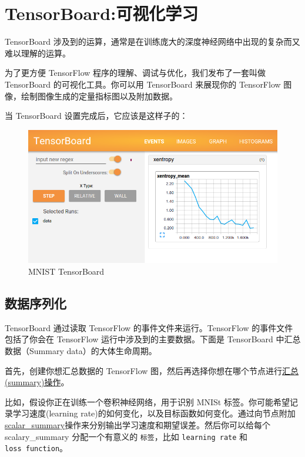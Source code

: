 

\section{TensorBoard:可视化学习　}\label{vis_learning}

TensorBoard
涉及到的运算，通常是在训练庞大的深度神经网络中出现的复杂而又难以理解的运算。

为了更方便 TensorFlow 程序的理解、调试与优化，我们发布了一套叫做
TensorBoard 的可视化工具。你可以用 TensorBoard 来展现你的 TensorFlow
图像，绘制图像生成的定量指标图以及附加数据。

当 TensorBoard 设置完成后，它应该是这样子的：

\begin{figure}[htbp]
\centering
\includegraphics[width=.95\textwidth]{../SOURCE/images/mnist_tensorboard.png}
\caption{MNIST TensorBoard}
\end{figure}

\subsection{数据序列化　}\label{ux6570ux636eux5e8fux5217ux5316}

TensorBoard 通过读取 TensorFlow 的事件文件来运行。TensorFlow
的事件文件包括了你会在 TensorFlow 运行中涉及到的主要数据。下面是
TensorBoard 中汇总数据（Summary data）的大体生命周期。

首先，创建你想汇总数据的 TensorFlow
图，然后再选择你想在哪个节点进行\href{../api_docs/python/train.md\#summary_options}{汇总(summary)操作}。

比如，假设你正在训练一个卷积神经网络，用于识别 MNISt
标签。你可能希望记录学习速度(learning
rate)的如何变化，以及目标函数如何变化。通过向节点附加\href{../api_docs/python/train.md\#scalary_summary}{scalar\_summary}操作来分别输出学习速度和期望误差。然后你可以给每个
scalary\_summary 分配一个有意义的 \texttt{标签}，比如
\texttt{\textquotesingle{}learning\ rate\textquotesingle{}} 和
\texttt{\textquotesingle{}loss\ function\textquotesingle{}}。

